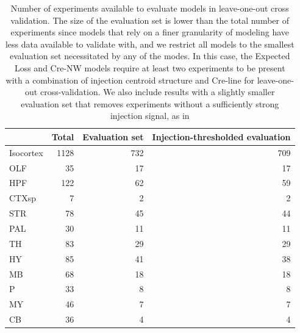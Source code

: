 \begin{table}[H]
\small
\begin{tabular}{lrrr}
\toprule
{} &  Total &  Evaluation set &  Injection-thresholded evaluation \\
\midrule
Isocortex &   1128 &             732 &                               709 \\
OLF       &     35 &              17 &                                17 \\
HPF       &    122 &              62 &                                59 \\
CTXsp     &      7 &               2 &                                 2 \\
STR       &     78 &              45 &                                44 \\
PAL       &     30 &              11 &                                11 \\
TH        &     83 &              29 &                                29 \\
HY        &     85 &              41 &                                38 \\
MB        &     68 &              18 &                                18 \\
P         &     33 &               8 &                                 8 \\
MY        &     46 &               7 &                                 7 \\
CB        &     36 &               4 &                                 4 \\
\bottomrule
\end{tabular}
\caption{Number of experiments available to evaluate models in leave-one-out cross validation.
The size of the evaluation set is lower than the total number of experiments since models that rely on a finer granularity of modeling have less data available to validate with,
and we restrict all models to the smallest evaluation set necessitated by any of the modes.
In this case, the Expected Loss and Cre-NW models require at least two experiments to be present with a combination of injection centroid structure and Cre-line for leave-one-out cross-validation. 
We also include results with a slightly smaller evaluation set that removes experiments without a sufficiently strong injection signal, as in \citet{Knox2019-ot}} 
\label{tab:eval_size}
\end{table}

\newpage

